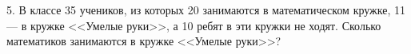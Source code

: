 5. В классе 35 учеников, из которых 20 занимаются в математическом кружке, 11 --- в кружке <<Умелые руки>>, а 10 ребят в эти кружки не ходят. Сколько математиков занимаются в кружке <<Умелые руки>>?\\
